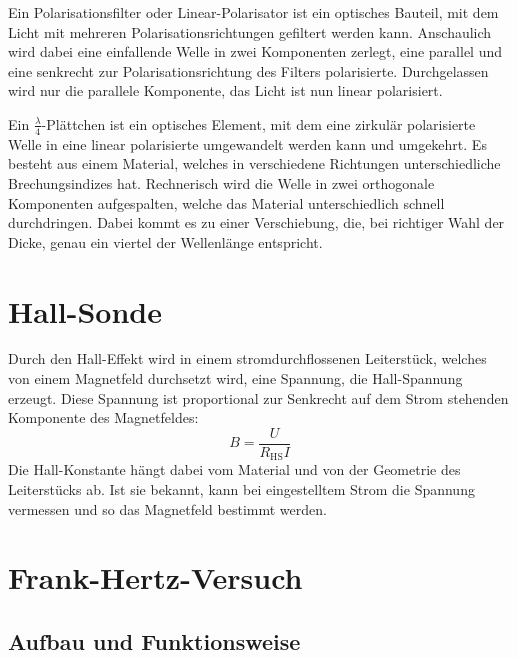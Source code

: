 Ein Polarisationsfilter oder Linear-Polarisator ist ein optisches Bauteil, mit
dem Licht mit mehreren Polarisationsrichtungen gefiltert werden kann.
Anschaulich wird dabei eine einfallende Welle in zwei Komponenten zerlegt, eine
parallel und eine senkrecht zur Polarisationsrichtung des Filters polarisierte.
Durchgelassen wird nur die parallele Komponente, das Licht ist nun linear
polarisiert.

Ein $\frac\lambda4$-Plättchen ist ein optisches Element, mit dem eine zirkulär
polarisierte Welle in eine linear polarisierte umgewandelt werden kann und
umgekehrt. Es besteht aus einem Material, welches in verschiedene Richtungen
unterschiedliche Brechungsindizes hat. Rechnerisch wird die Welle in zwei
orthogonale Komponenten aufgespalten, welche das Material unterschiedlich
schnell durchdringen. Dabei kommt es zu einer Verschiebung, die, bei richtiger
Wahl der Dicke, genau ein viertel der Wellenlänge entspricht.

\section{Hall-Sonde}

Durch den Hall-Effekt wird in einem stromdurchflossenen Leiterstück, welches
von einem Magnetfeld durchsetzt wird, eine Spannung, die Hall-Spannung erzeugt.
Diese Spannung ist proportional zur Senkrecht auf dem Strom stehenden
Komponente des Magnetfeldes:
\[
    B = \frac{U}{R_\text{HS}I}
\]
Die Hall-Konstante hängt dabei vom Material und von der Geometrie des
Leiterstücks ab. Ist sie bekannt, kann bei eingestelltem Strom die Spannung
vermessen und so das Magnetfeld bestimmt werden.

\section{Frank-Hertz-Versuch}

\subsection{Aufbau und Funktionsweise}
\label{ssec:Aufbau_FH}

